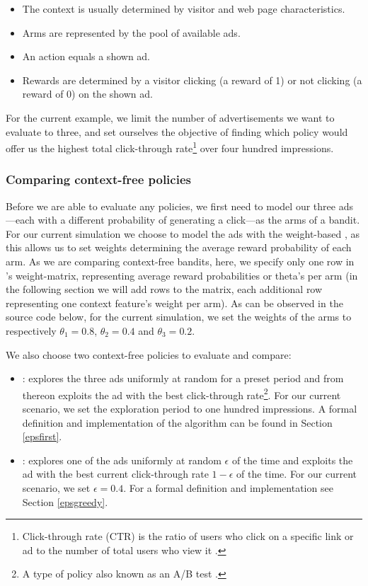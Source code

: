 \documentclass{jss}
\begin{document}
\begin{itemize}
         \item The context is usually determined by visitor and web page characteristics.
         \item Arms are represented by the pool of available ads.
         \item An action equals a shown ad.
         \item Rewards are determined by a visitor clicking (a reward of 1) or not clicking (a reward of 0) on the shown ad.
\end{itemize}

For the current example, we limit the number of advertisements we want to evaluate to three, and set ourselves the objective of finding which policy would offer us the highest total click-through rate\footnote{Click-through rate (CTR) is the ratio of users who click on a specific link or ad to the number of total users who view it \citep{Briggs1997}.} over four hundred impressions.

\subsubsection{Comparing context-free policies} \label{ncp}

Before we are able to evaluate any policies, we first need to model our three ads---each with a different probability of generating a click---as the arms of a bandit. For our current simulation we choose to model the ads with the weight-based , as this allows us to set weights determining the average reward probability of each arm. As we are comparing context-free bandits, here, we specify only one row in 's weight-matrix, representing average reward probabilities or theta's per arm (in the following section we will add rows to the matrix, each additional row representing one context feature's weight per arm). As can be observed in the source code below, for the current simulation, we set the weights of the arms to respectively $\theta_1 = 0.8$, $\theta_2  = 0.4$ and $\theta_3 = 0.2$.

We also choose two context-free policies to evaluate and compare:

\begin{itemize}
         \item {}: explores the three ads uniformly at random for a preset period and from thereon exploits the ad with the best click-through rate\footnote{A type of policy also known as an A/B test \citep{Kohavi2007}.}. For our current scenario, we set the exploration period to one hundred impressions. A formal definition and implementation of the algorithm can be found in Section \ref{epsfirst}.

         \item {}: explores one of the ads uniformly at random $\epsilon$ of the time and exploits the ad with the best current click-through rate $1 - \epsilon$ of the time. For our current scenario, we set $\epsilon = 0.4$. For a formal definition and implementation see Section \ref{epsgreedy}.
\end{itemize}
\end{document}
